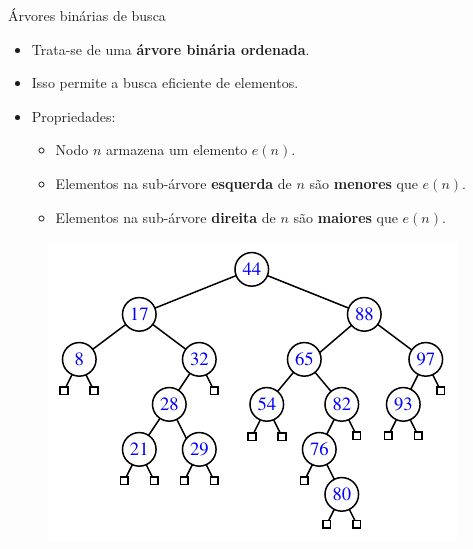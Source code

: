 \begin{frame}{Árvores binárias de busca}
\begin{itemize}
	\item Trata-se de uma \textbf{árvore binária ordenada}.
	\item Isso permite a busca eficiente de elementos.
	\item Propriedades:
	\begin{itemize}
		\item Nodo $n$ armazena um elemento $e(n)$.
		\item Elementos na sub-árvore \textbf{esquerda} de $n$ são \textbf{menores} que $e(n)$.
		\item Elementos na sub-árvore \textbf{direita} de $n$ são \textbf{maiores} que $e(n)$.
	\end{itemize}
\end{itemize}

\begin{figure}
	\centering
	\includegraphics[width=0.55\linewidth]{img/figure-11-1}
\end{figure}
\end{frame}


